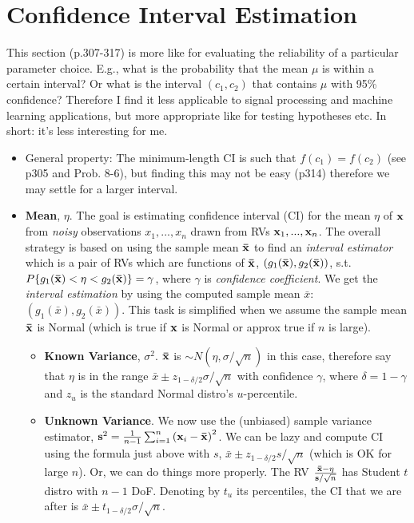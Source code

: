 \documentclass[a4paper, oneside]{book}
\begin{document}
\section{Confidence Interval Estimation}
This section (p.307-317) is more like for evaluating the reliability of a particular parameter choice. E.g., what is the probability that the mean $\mu$ is within a certain interval? Or what is the interval $(c_1, c_2)$ that contains $\mu$ with 95\% confidence? Therefore I find it less applicable to signal processing and machine learning applications, but more appropriate like for testing hypotheses etc. In short: it's less interesting for me.

\begin{itemize}
\item General property: The minimum-length CI is such that $f(c_1)=f(c_2)$ (see p305 and Prob. 8-6), but finding this may not be easy (p314) therefore we may settle for a larger interval.
\item \textbf{Mean}, $\eta$. The goal is estimating confidence interval (CI) for the mean $\eta$ of $\mathbf{x}$ from \textit{noisy} observations $x_1, ..., x_n$ drawn from RVs $\mathbf{x}_1, ..., \mathbf{x}_n$. The overall strategy is based on using the sample mean $\mathbf{\bar{x}}$ to find an \textit{interval estimator} which is a pair of RVs which are functions of $\mathbf{\bar{x}}$, $\left(g_1(\mathbf{\bar{x}}), g_2(\mathbf{\bar{x}})\right)$, s.t. $P\{g_1(\mathbf{\bar{x}}) < \eta < g_2(\mathbf{\bar{x}})\}=\gamma$, where $\gamma$ is \textit{confidence coefficient}. We get the \textit{interval estimation} by using the computed sample mean $\bar{x}$: $\left(g_1(\bar{x}), g_2(\bar{x})\right)$. This task is simplified when we assume the sample mean $\mathbf{\bar{x}}$ is Normal (which is true if $\mathbf{x}$ is Normal or approx true if $n$ is large).
	\begin{itemize}
	\item \textbf{Known Variance}, $\sigma^2$. $\mathbf{\bar{x}}$ is $\sim N(\eta,\sigma/\sqrt{n})$ in this case, therefore say that $\eta$ is in the range $\bar{x}\pm z_{1-\delta/2} \sigma/\sqrt{n}$  with confidence $\gamma$, where $\delta = 1-\gamma$ and $z_u$ is the standard Normal distro's $u$-percentile.
	\item \textbf{Unknown Variance}. We now use the (unbiased) sample variance estimator, $\mathbf{s}^2=\frac{1}{n-1}\sum_{i=1}^{n}\left(\mathbf{x}_i-\mathbf{\bar{x}}\right)^2$. We can be lazy and compute CI using the formula just above with $s$, \ie $\bar{x}\pm z_{1-\delta/2} s/\sqrt{n}$ (which is OK for large $n$). Or, we can do things more properly. The RV $\frac{\mathbf{\bar{x}}-\eta}{\mathbf{s}/\sqrt{n}}$ has Student $t$ distro with $n-1$ DoF. Denoting by $t_u$ its percentiles, the CI that we are after is $\bar{x}\pm t_{1-\delta/2} \sigma/\sqrt{n}$.

\end{itemize}
\end{itemize}
\end{document}
